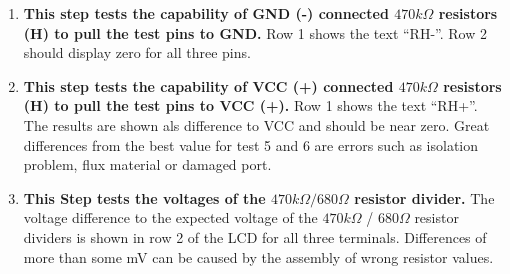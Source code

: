 \begin{enumerate}
\item {\bf This step tests the capability of GND (-) connected \(470k\Omega\) resistors (H) to pull the test pins to GND.}
Row 1 shows the text  ``RH-''.
Row 2 should display zero for all three pins.

\item {\bf This step tests the capability of VCC (+) connected \(470k\Omega\) resistors (H) to pull the test pins  to VCC (+).}
Row 1 shows the text ``RH+''.
The results are shown als difference to VCC and should be near zero.
 Great differences from the best value for test 5 and 6 are errors  such as isolation problem, flux material or damaged port.

\item {\bf This Step tests the voltages of the \(470 k\Omega / 680 \Omega\)  resistor divider.}
The voltage difference to the expected voltage of the \(470 k\Omega\) / \(680 \Omega\) resistor dividers is shown
in row 2 of the LCD for all three terminals.
Differences of more than some mV can be caused by the assembly of wrong resistor values.


\end{enumerate}
